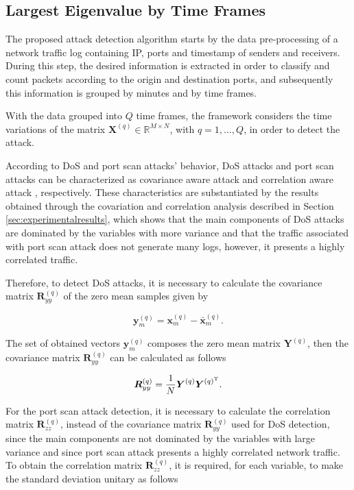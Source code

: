 \documentclass{bmcart}
\begin{document}
\subsection{Largest Eigenvalue by Time Frames}
\label{sec:prop_LargestEigenvaluebyTimeFrames}

The proposed attack detection algorithm starts by the data pre-processing of a network traffic log containing IP, ports and timestamp of senders and receivers. During this step, the desired information is extracted in order to classify and count packets according to the origin and destination ports, and subsequently this information is grouped by minutes and by time frames.

With the data grouped into $Q$ time frames, the framework considers the time variations of the matrix $\boldsymbol{X}^{(q)} \in \mathbb{R}^{M\times{N}}$, with $q = 1, \ldots, Q$, in order to detect the attack. 

According to DoS and port scan attacks' behavior, DoS attacks and port scan attacks can be characterized as covariance aware attack \citep{jin2004covariance} and correlation aware attack \citep{lakhina2005mining}, respectively. These characteristics are substantiated by the results obtained through the covariation and correlation analysis described in Section \ref{sec:experimentalresults}, which shows that the main components of DoS attacks are dominated by the variables with more variance and that the traffic associated with port scan attack does not generate many logs, however, it presents a highly correlated traffic.

Therefore, to detect DoS attacks, it is necessary to calculate the covariance matrix $\boldsymbol{R}_{yy}^{(q)}$ of the zero mean samples given by

\begin{equation}\label{eq:eq02}
\boldsymbol{y}_{m}^{(q)} = \boldsymbol{x}_{m}^{(q)} - \bar{\boldsymbol{x}}_{m}^{(q)}.
\end{equation}

The set of obtained vectors $\boldsymbol{y}_{m}^{(q)}$ composes the zero mean matrix $\boldsymbol{Y}^{(q)}$, then the covariance matrix $\boldsymbol{R}_{yy}^{(q)}$ can be calculated as follows

\begin{equation}\label{eq:eq03}
\boldsymbol{R}_{yy}^{(q)} = \frac{1}{N}\boldsymbol{Y}^{(q)}\boldsymbol{Y}^{(q)^{\rm T}}.
\end{equation}

For the port scan attack detection, it is necessary to calculate the correlation matrix $\boldsymbol{R}_{zz}^{(q)}$, instead of the covariance matrix $\boldsymbol{R}_{yy}^{(q)}$ used for DoS detection, since the main components are not dominated by the variables with large variance and since port scan attack presents a highly correlated network traffic. To obtain the correlation matrix $\boldsymbol{R}_{zz}^{(q)}$, it is required, for each variable, to make the standard deviation unitary as follows
\end{document}
